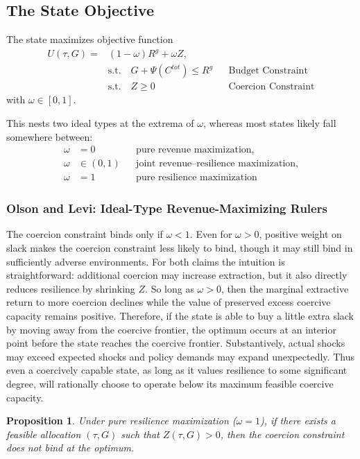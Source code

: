 \documentclass[12pt]{article}
\newtheorem{proposition}{Proposition}
\begin{document}
\subsection{The State Objective}

The state maximizes objective function
\begin{align}
U(\tau,G) =& (1-\omega)R^g + \omega Z, \\
& \text{s.t.} \quad G + \Psi(C^{tot}) \le R^g && \text{Budget Constraint} \\
& \text{s.t.} \quad Z \ge 0 && \text{Coercion Constraint}
\label{eq:jointobj}
\end{align}
with $\omega \in [0,1]$.

This nests two ideal types at the extrema of $\omega$, whereas most states likely fall somewhere between:
\begin{align*}
\omega &= 0 && \text{pure revenue maximization},\\
\omega &\in (0,1) && \text{joint revenue--resilience maximization}, \\
\omega &= 1 && \text{pure resilience maximization}
\end{align*}

\subsubsection{Olson and Levi: Ideal-Type Revenue-Maximizing Rulers}

The coercion constraint binds only if $\omega<1$. Even for $\omega>0$, positive weight on slack makes the coercion constraint less likely to bind, though it may still bind in sufficiently adverse environments. For both claims the intuition is straightforward: additional coercion may increase extraction, but it also directly reduces resilience by shrinking $Z$. So long as $\omega > 0$, then the marginal extractive return to more coercion declines while the value of preserved excess coercive capacity remains positive. Therefore, if the state is able to buy a little extra slack by moving away from the coercive frontier, the optimum occurs at an interior point before the state reaches the coercive frontier. Substantively, actual shocks may exceed expected shocks and policy demands may expand unexpectedly. Thus even a coercively capable state, as long as it values resilience to some significant degree, will rationally choose to operate below its maximum feasible coercive capacity.

\begin{proposition}\label{prop:bindsonlyomega1}
Under pure resilience maximization (\(\omega = 1\)), if there exists a feasible allocation \((\tau,G)\) such that \(Z(\tau,G)>0\), then the coercion constraint does not bind at the optimum.
\end{proposition}
\end{document}
